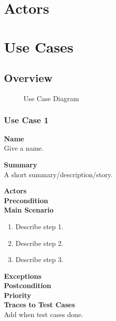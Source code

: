 \documentclass[12pt]{article}
\begin{document}
\clearpage

\section{Actors}

\clearpage

\section{Use Cases}

\subsection{Overview}

\begin{figure}[htbp]
\caption{Use Case Diagram}
\label{fig:use-case-diagram}
\end{figure}

\subsubsection{Use Case 1} \label{uc:1}

\noindent
{\bf Name}\\
Give a name.

\noindent
{\bf Summary}\\
A short summary/description/story.

\noindent
{\bf Actors}\\

\noindent
{\bf Precondition}\\

\noindent
{\bf Main Scenario}\\
\vspace*{-0.2in}
\begin{enumerate}
\item Describe step 1.
\item Describe step 2.
\item Describe step 3.
\end{enumerate}

\noindent
{\bf Exceptions}\\

\noindent
{\bf Postcondition}\\

\noindent
{\bf Priority}\\

\noindent
{\bf Traces to Test Cases}\\
Add when test cases done.
\end{document}
